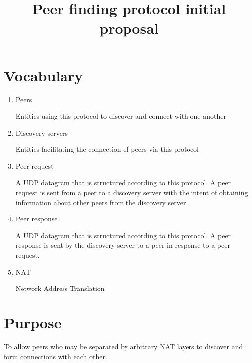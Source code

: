 \documentclass{article}
\title{Peer finding protocol initial proposal}
\begin{document}
\maketitle
\section{Vocabulary}
\begin{enumerate}
\item Peers

  Entities using this protocol to discover and connect with one another

\item Discovery servers

  Entities facilitating the connection of peers via this protocol

\item Peer request

  A UDP datagram that is structured according to this protocol. A peer request is sent from a peer to a discovery server with the intent of obtaining information about other peers from the discovery server.

\item Peer response

  A UDP datagram that is structured according to this protocol. A peer response is sent by the discovery server to a peer in response to a peer request.

\item NAT

  Network Address Translation

\end{enumerate}

\section{Purpose}
To allow peers who may be separated by arbitrary NAT layers to discover and form connections with each other.
\end{document}
